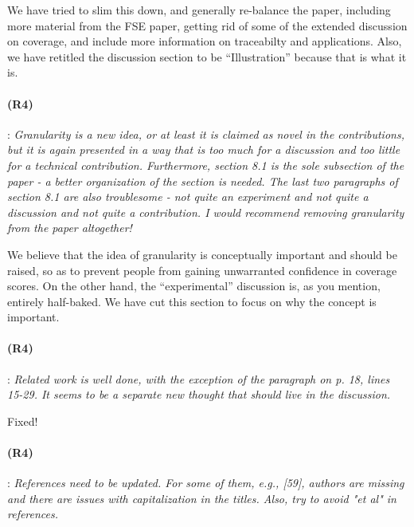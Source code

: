 \documentclass{article}
\begin{document}

We have tried to slim this down, and generally re-balance the paper, including more material from the FSE paper, getting rid of some of the extended discussion on coverage, and include more information on traceabilty and applications.  Also, we have retitled the discussion section to be ``Illustration'' because that is what it is.

\paragraph{(R4)}: \textit{Granularity is a new idea, or at least it is claimed as novel in the contributions, but it is again presented in a way that is too much for a discussion and too little for a technical contribution. Furthermore, section 8.1 is the sole subsection of the paper - a better organization of the section is needed.  The last two paragraphs of section 8.1 are also troublesome - not quite an experiment and not quite a discussion and not quite a contribution.  I would recommend removing granularity from the paper altogether!}
\vspace{0.05in}

We believe that the idea of granularity is conceptually important and should be raised, so as to prevent people from gaining unwarranted confidence in coverage scores.  On the other hand, the ``experimental'' discussion is, as you mention, entirely half-baked.  We have cut this section to focus on why the concept is important.


\paragraph{(R4)}: \textit{Related work is well done, with the exception of the paragraph on p. 18, lines 15-29. It seems to be a separate new thought that should live in the discussion.} 
\vspace{0.05in}

Fixed!

\paragraph{(R4)}: \textit{References need to be updated. For some of them, e.g., [59], authors are missing and there are issues with capitalization in the titles. Also, try to avoid "et al" in references.}
\vspace{0.05in}
\end{document}
